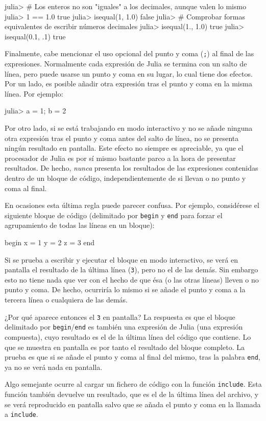 ﻿\documentclass{article}
\newcommand{\code}{\texttt}
\begin{document}
julia> # Los enteros no son "iguales" a los decimales, aunque valen lo mismo
julia> 1 == 1.0
true
julia> isequal(1, 1.0)
false
julia> # Comprobar formas equivalentes de escribir números decimales
julia> isequal(1., 1.0)
true
julia> isequal(0.1, .1)
true

Finalmente, cabe mencionar el uso opcional del punto y coma (\code{;}) al final de las expresiones. Normalmente cada expresión de Julia se termina con un salto de línea, pero puede usarse un punto y coma en su lugar, lo cual tiene dos efectos. Por un lado, es posible añadir otra expresión tras el punto y coma en la misma línea. Por ejemplo:

julia> a = 1; b = 2

Por otro lado, si se está trabajando en modo interactivo y no se añade ninguna otra expresión tras el punto y coma antes del salto de línea, no se presenta ningún resultado en pantalla. Este efecto no siempre es apreciable, ya que el procesador de Julia es por sí mismo bastante parco a la hora de presentar resultados. De hecho, \emph{nunca} presenta los resultados de las expresiones contenidas dentro de un bloque de código, independientemente de si llevan o no punto y coma al final.

En ocasiones esta última regla puede parecer confusa. Por ejemplo, considérese el siguiente bloque de código (delimitado por \code{begin} y \code{end} para forzar el agrupamiento de todas las líneas en un bloque):

begin
  x = 1
  y = 2
  z = 3
end

Si se prueba a escribir y ejecutar el bloque en modo interactivo, se verá en pantalla el resultado de la última línea (\code{3}), pero no el de las demás. Sin embargo esto no tiene nada que ver con el hecho de que ésa (o las otras líneas) lleven o no punto y coma. De hecho, ocurriría lo mismo si se añade el punto y coma a la tercera línea o cualquiera de las demás.

¿Por qué aparece entonces el \code{3} en pantalla? La respuesta es que el bloque delimitado por \code{begin}/\code{end} es también una expresión de Julia (una expresión compuesta), cuyo resultado es el de la última línea del código que contiene. Lo que se muestra en pantalla es por tanto el resultado del bloque completo. La prueba es que si se añade el punto y coma al final del mismo, tras la palabra \code{end}, ya no se verá nada en pantalla.

Algo semejante ocurre al cargar un fichero de código con la función \code{include}. Esta función también devuelve un resultado, que es el de la última línea del archivo, y se verá reproducido en pantalla salvo que se añada el punto y coma en la llamada a \code{include}.
\end{document}
